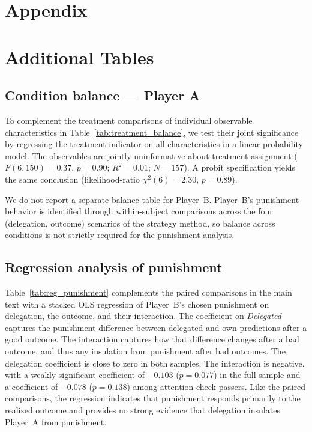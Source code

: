 \section*{Appendix} \label{appendix}

\appendix

\section{Additional Tables} \label{appendix:tables}

\subsection{Condition balance --- Player A} \label{appendix:sum_stats}



To complement the treatment comparisons of individual observable characteristics in Table~\ref{tab:treatment_balance}, we test their joint significance by regressing the treatment indicator on all characteristics in a linear probability model. The observables are jointly uninformative about treatment assignment ($F(6,150)=0.37$, $p=0.90$; $R^2=0.01$; $N=157$). A probit specification yields the same conclusion (likelihood-ratio $\chi^2(6)=2.30$, $p=0.89$).

We do not report a separate balance table for Player~B. Player~B's punishment behavior is identified through within-subject comparisons across the four (delegation, outcome) scenarios of the strategy method, so balance across conditions is not strictly required for the punishment analysis.

\subsection{Regression analysis of punishment} \label{appendix:reg_punishment}

Table~\ref{tab:reg_punishment} complements the paired comparisons in the main text with a stacked OLS regression of Player~B's chosen punishment on delegation, the outcome, and their interaction. The coefficient on \textit{Delegated} captures the punishment difference between delegated and own predictions after a good outcome. The interaction captures how that difference changes after a bad outcome, and thus any insulation from punishment after bad outcomes. The delegation coefficient is close to zero in both samples. The interaction is negative, with a weakly significant coefficient of $-0.103$ ($p=0.077$) in the full sample and a coefficient of $-0.078$ ($p=0.138$) among attention-check passers. Like the paired comparisons, the regression indicates that punishment responds primarily to the realized outcome and provides no strong evidence that delegation insulates Player~A from punishment.

